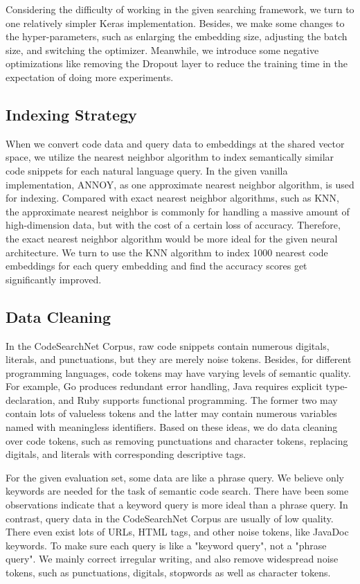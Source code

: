 Considering the difficulty of working in the given searching framework, we turn to one relatively simpler Keras implementation. Besides, we make some changes to the hyper-parameters, such as enlarging the embedding size, adjusting the batch size, and switching the optimizer. Meanwhile, we introduce some negative optimizations like removing the Dropout layer to reduce the training time in the expectation of doing more experiments.

\subsection{Indexing Strategy}

When we convert code data and query data to embeddings at the shared vector space, we utilize the nearest neighbor algorithm to index semantically similar code snippets for each natural language query. In the given vanilla implementation, ANNOY, as one approximate nearest neighbor algorithm, is used for indexing. Compared with exact nearest neighbor algorithms, such as KNN, the approximate nearest neighbor is commonly for handling a massive amount of high-dimension data, but with the cost of a certain loss of accuracy. Therefore, the exact nearest neighbor algorithm would be more ideal for the given neural architecture. We turn to use the KNN algorithm to index 1000 nearest code embeddings for each query embedding and find the accuracy scores get significantly improved.

\subsection{Data Cleaning}

In the CodeSearchNet Corpus, raw code snippets contain numerous digitals, literals, and punctuations, but they are merely noise tokens. Besides, for different programming languages, code tokens may have varying levels of semantic quality. For example, Go produces redundant error handling, Java requires explicit type-declaration, and Ruby supports functional programming. The former two may contain lots of valueless tokens and the latter may contain numerous variables named with meaningless identifiers. Based on these ideas, we do data cleaning over code tokens, such as removing punctuations and character tokens, replacing digitals, and literals with corresponding descriptive tags.

For the given evaluation set, some data are like a phrase query. We believe only keywords are needed for the task of semantic code search. There have been some observations \cite{Yan2020AreTC} indicate that a keyword query is more ideal than a phrase query. In contrast, query data in the CodeSearchNet Corpus are usually of low quality. There even exist lots of URLs, HTML tags, and other noise tokens, like JavaDoc keywords. To make sure each query is like a "keyword query", not a "phrase query". We mainly correct irregular writing, and also remove widespread noise tokens, such as punctuations, digitals, stopwords as well as character tokens.

